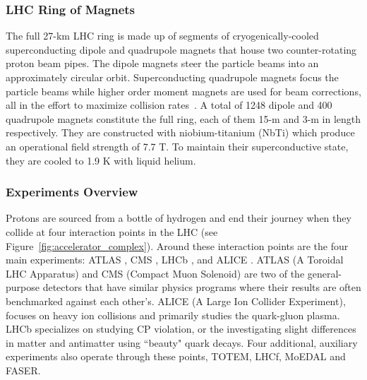 \subsubsection{LHC Ring of Magnets}
The full 27-km LHC ring is made up of segments of cryogenically-cooled superconducting dipole and quadrupole magnets that house two counter-rotating proton beam pipes. The dipole magnets steer the particle beams into an approximately circular orbit. Superconducting quadrupole magnets focus the particle beams while higher order moment magnets are used for beam corrections, all in the effort to maximize collision rates~\cite{Rossi:2002ye}. A total of 1248 dipole and 400 quadrupole magnets constitute the full ring, each of them 15-m and 3-m in length respectively. They are constructed with niobium-titanium (NbTi) which produce an operational field strength of 7.7 T. To maintain their superconductive state, they are cooled to 1.9 K with liquid helium.

\subsubsection{Experiments Overview}
 Protons are sourced from a bottle of hydrogen and end their journey when they collide at four interaction points in the LHC (see Figure~\ref{fig:accelerator_complex}). Around these interaction points are the four main experiments: ATLAS \cite{ATLAS:2008xda}, CMS \cite{CMS:2008xjf}, LHCb \cite{LHCb:2008vvz}, and ALICE \cite{ALICE:2008ngc}. ATLAS (A Toroidal LHC Apparatus) and CMS (Compact Muon Solenoid) are two of the general-purpose detectors that have similar physics programs where their results are often benchmarked against each other's. ALICE (A Large Ion Collider Experiment), focuses on heavy ion collisions and primarily studies the quark-gluon plasma. LHCb specializes on studying CP violation, or the investigating slight differences in matter and antimatter using ``beauty" quark decays. Four additional, auxiliary experiments also operate through these points, TOTEM, LHCf, MoEDAL and FASER.  

